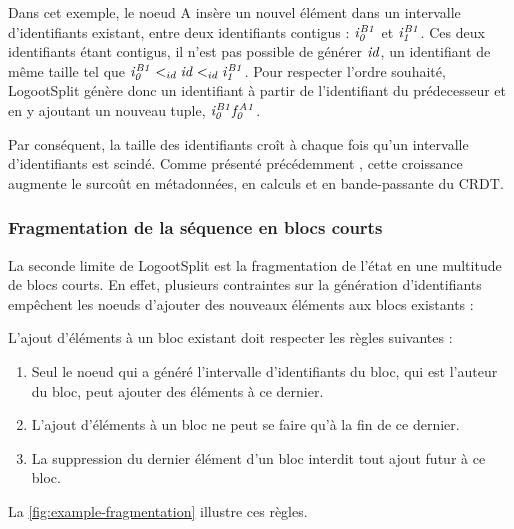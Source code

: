 Dans cet exemple, le noeud A insère un nouvel élément dans un intervalle d'identifiants existant, \ie entre deux identifiants contigus : $\mathit{i}^{\mathit{B1}}_{\mathit{0}}$ et $\mathit{i}^{\mathit{B1}}_{\mathit{1}}$.
Ces deux identifiants étant contigus, il n'est pas possible de générer $\mathit{id}$, un identifiant de même taille tel que $\mathit{i}^{\mathit{B1}}_{\mathit{0}} <_{id} \mathit{id} <_{id} \mathit{i}^{\mathit{B1}}_{\mathit{1}}$.
Pour respecter l'ordre souhaité, LogootSplit génère donc un identifiant à partir de l'identifiant du prédecesseur et en y ajoutant un nouveau tuple, \eg $\mathit{i}^{\mathit{B1}}_{\mathit{0}}\mathit{f}^{\mathit{A1}}_{\mathit{0}}$.

Par conséquent, la taille des identifiants croît à chaque fois qu'un intervalle d'identifiants est scindé.
Comme présenté précédemment , cette croissance augmente le surcoût en métadonnées, en calculs et en bande-passante du \ac{CRDT}.

\subsubsection{Fragmentation de la séquence en blocs courts}

La seconde limite de LogootSplit est la fragmentation de l'état en une multitude de blocs courts.
En effet, plusieurs contraintes sur la génération d'identifiants empêchent les noeuds d'ajouter des nouveaux éléments aux blocs existants :

\begin{definition}
  L'ajout d'éléments à un bloc existant doit respecter les règles suivantes :
  \begin{enumerate}
    \item Seul le noeud qui a généré l'intervalle d'identifiants du bloc, \ie qui est l'auteur du bloc, peut ajouter des éléments à ce dernier.
    \item L'ajout d'éléments à un bloc ne peut se faire qu'à la fin de ce dernier.
    \item La suppression du dernier élément d'un bloc interdit tout ajout futur à ce bloc.
  \end{enumerate}
\end{definition}

La \autoref{fig:example-fragmentation} illustre ces règles.

